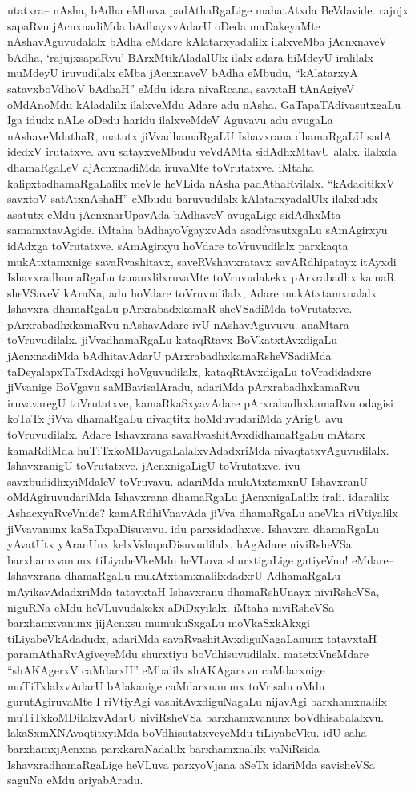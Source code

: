\begin{artha}
utatxra{\rm --} nAsha, bAdha eMbuva padAthaRgaLige mahatAtxda BeVdavide. rajujx sapaRvu jAcnxnadiMda bAdhayxvAdarU oDeda maDakeyaMte nAshavAguvudalalx bAdha eMdare kAlatarxyadalilx ilalxveMba jAcnxnaveV bAdha, `rajujxsapaRvu' BArxMtikAladalUlx ilalx adara hiMdeyU iralilalx muMdeyU iruvudilalx eMba jAcnxnaveV bAdha eMbudu, ``kAlatarxyA satavxboVdhoV bAdhaH'' eMdu idara nivaRcana, savxtaH tAnAgiyeV oMdAnoMdu kAladalilx ilalxveMdu Adare adu nAsha. GaTapaTAdivasutxgaLu Iga idudx nALe oDedu haridu ilalxveMdeV Aguvavu adu avugaLa nAshaveMdathaR, matutx jiVvadhamaRgaLU Ishavxrana dhamaRgaLU sadA idedxV irutatxve. avu satayxveMbudu veVdAMta sidAdhxMtavU alalx. ilalxda dhamaRgaLeV ajAcnxnadiMda iruvaMte toVrutatxve. iMtaha kalipxtadhamaRgaLalilx meVle heVLida nAsha padAthaRvilalx. ``kAdacitikxV savxtoV satAtxnAshaH'' eMbudu baruvudilalx kAlatarxyadalUlx ilalxdudx asatutx eMdu jAcnxnarUpavAda bAdhaveV avugaLige sidAdhxMta samamxtavAgide. iMtaha bAdhayoVgayxvAda asadfvasutxgaLu sAmAgirxyu idAdxga toVrutatxve. sAmAgirxyu hoVdare toVruvudilalx parxkaqta mukAtxtamxnige savaRvashitavx, saveRVshavxratavx savARdhipatayx itAyxdi IshavxradhamaRgaLu tananxlilxruvaMte toVruvudakekx pArxrabadhx kamaR sheVSaveV kAraNa, adu hoVdare toVruvudilalx, Adare mukAtxtamxnalalx Ishavxra dhamaRgaLu pArxrabadxkamaR sheVSadiMda toVrutatxve. pArxrabadhxkamaRvu nAshavAdare ivU nAshavAguvuvu. anaMtara toVruvudilalx. jiVvadhamaRgaLu kataqRtavx BoVkatxtAvxdigaLu jAcnxnadiMda bAdhitavAdarU pArxrabadhxkamaRsheVSadiMda taDeyalapxTaTxdAdxgi hoVguvudilalx, kataqRtAvxdigaLu toVradidadxre jiVvanige BoVgavu saMBavisalAradu, adariMda pArxrabadhxkamaRvu iruvavaregU toVrutatxve, kamaRkaSxyavAdare pArxrabadhxkamaRvu odagisi koTaTx jiVva dhamaRgaLu nivaqtitx hoMduvudariMda yArigU avu toVruvudilalx. Adare Ishavxrana savaRvashitAvxdidhamaRgaLu mAtarx kamaRdiMda huTiTxkoMDavugaLalalxvAdadxriMda nivaqtatxvAguvudilalx. IshavxranigU toVrutatxve. jAcnxnigaLigU toVrutatxve. ivu savxbudidhxyiMdaleV toVruvavu. adariMda mukAtxtamxnU IshavxranU oMdAgiruvudariMda Ishavxrana dhamaRgaLu jAcnxnigaLalilx irali. idaralilx AshacxyaRveVnide? kamARdhiVnavAda jiVva dhamaRgaLu aneVka riVtiyalilx jiVvavanunx kaSaTxpaDisuvavu. idu parxsidadhxve. Ishavxra dhamaRgaLu yAvatUtx yAranUnx kelxVshapaDisuvudilalx. hAgAdare niviRsheVSa barxhamxvanunx tiLiyabeVkeMdu heVLuva shurxtigaLige gatiyeVnu! eMdare{\rm --} Ishavxrana dhamaRgaLu mukAtxtamxnalilxdadxrU AdhamaRgaLu mAyikavAdadxriMda tatavxtaH Ishavxranu dhamaRshUnayx niviRsheVSa, niguRNa eMdu heVLuvudakekx aDiDxyilalx. iMtaha niviRsheVSa barxhamxvanunx jijAcnxsu mumukuSxgaLu moVkaSxkAkxgi tiLiyabeVkAdadudx, adariMda savaRvashitAvxdiguNagaLanunx tatavxtaH paramAthaRvAgiveyeMdu shurxtiyu boVdhisuvudilalx. matetxVneMdare ``shAKAgerxV caMdarxH'' eMbalilx shAKAgarxvu caMdarxnige muTiTxlalxvAdarU bAlakanige caMdarxnanunx toVrisalu oMdu gurutAgiruvaMte I riVtiyAgi vashitAvxdiguNagaLu nijavAgi barxhamxnalilx muTiTxkoMDilalxvAdarU niviRsheVSa barxhamxvanunx boVdhisabalalxvu. lakaSxmXNAvaqtitxyiMda boVdhisutatxveyeMdu tiLiyabeVku. idU saha barxhamxjAcnxna parxkaraNadalilx barxhamxnalilx vaNiRsida IshavxradhamaRgaLige heVLuva parxyoVjana aSeTx idariMda savisheVSa saguNa eMdu ariyabAradu.


\end{artha}
